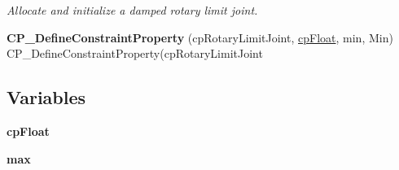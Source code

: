 \begin{DoxyCompactItemize}
\begin{DoxyCompactList}\small\item\em Allocate and initialize a damped rotary limit joint. \end{DoxyCompactList}\item 
\hypertarget{group__cp_rotary_limit_joint_gadb8d40b95b1ab31d8663dfe3e3ee0d53}{{\bfseries C\-P\-\_\-\-Define\-Constraint\-Property} (cp\-Rotary\-Limit\-Joint, \hyperlink{group__basic_types_gac1ed65573e035bf892505768c852d8d3}{cp\-Float}, min, Min) C\-P\-\_\-\-Define\-Constraint\-Property(cp\-Rotary\-Limit\-Joint}\label{group__cp_rotary_limit_joint_gadb8d40b95b1ab31d8663dfe3e3ee0d53}

\end{DoxyCompactItemize}
\subsection*{Variables}
\begin{DoxyCompactItemize}
\item 
\hypertarget{group__cp_rotary_limit_joint_ga771844b3ae466da0613e76d364d00bd3}{{\bfseries cp\-Float}}\label{group__cp_rotary_limit_joint_ga771844b3ae466da0613e76d364d00bd3}

\item 
\hypertarget{group__cp_rotary_limit_joint_gaa83862769f78fffb512bc9283007ef67}{{\bfseries max}}\label{group__cp_rotary_limit_joint_gaa83862769f78fffb512bc9283007ef67}

\end{DoxyCompactItemize}
